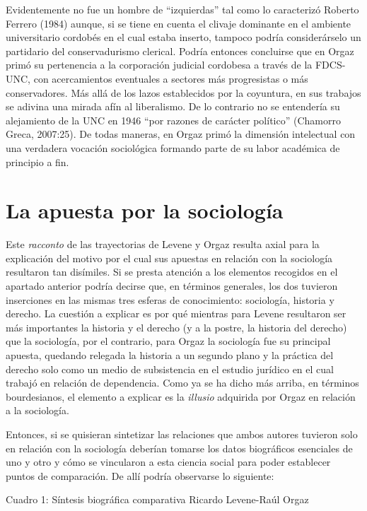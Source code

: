 Evidentemente no fue un hombre de \enquote{izquierdas} tal como lo caracterizó Roberto Ferrero (1984) aunque, si se tiene en cuenta el clivaje dominante en el ambiente universitario cordobés en el cual estaba inserto, tampoco podría considerárselo un partidario del conservadurismo clerical. Podría entonces concluirse que en Orgaz primó su pertenencia a la corporación judicial cordobesa a través de la FDCS-UNC, con acercamientos eventuales a sectores más progresistas o más conservadores. Más allá de los lazos establecidos por la coyuntura, en sus trabajos se adivina una mirada afín al liberalismo. De lo contrario no se entendería su alejamiento de la UNC en 1946 \enquote{por razones de carácter político} (Chamorro Greca, 2007:25). De todas maneras, en Orgaz primó la dimensión intelectual con una verdadera vocación sociológica formando parte de su labor académica de principio a fin.

\section{La apuesta por la sociología}

Este \emph{racconto} de las trayectorias de Levene y Orgaz resulta axial para la explicación del motivo por el cual sus apuestas en relación con la sociología resultaron tan disímiles. Si se presta atención a los elementos recogidos en el apartado anterior podría decirse que, en términos generales, los dos tuvieron inserciones en las mismas tres esferas de conocimiento: sociología, historia y derecho. La cuestión a explicar es por qué mientras para Levene resultaron ser más importantes la historia y el derecho (y a la postre, la historia del derecho) que la sociología, por el contrario, para Orgaz la sociología fue su principal apuesta, quedando relegada la historia a un segundo plano y la práctica del derecho solo como un medio de subsistencia en el estudio jurídico en el cual trabajó en relación de dependencia. Como ya se ha dicho más arriba, en términos bourdesianos, el elemento a explicar es la \emph{illusio} adquirida por Orgaz en relación a la sociología.

Entonces, si se quisieran sintetizar las relaciones que ambos autores tuvieron solo en relación con la sociología deberían tomarse los datos biográficos esenciales de uno y otro y cómo se vincularon a esta ciencia social para poder establecer puntos de comparación. De allí podría observarse lo siguiente:

Cuadro 1: Síntesis biográfica comparativa Ricardo Levene-Raúl Orgaz

